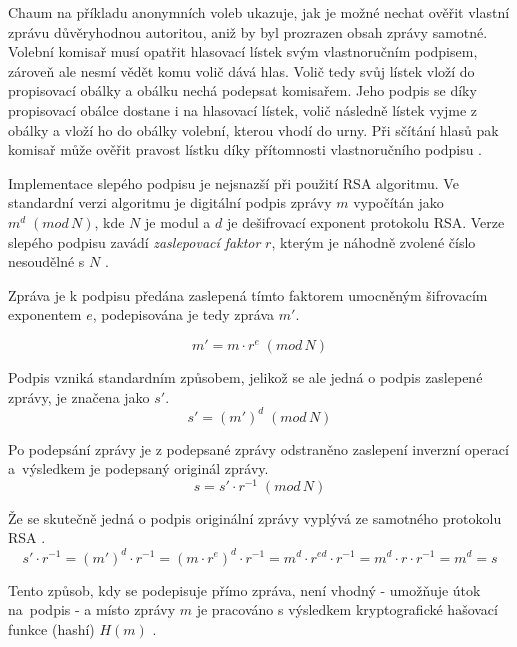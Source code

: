 Chaum na příkladu anonymních voleb ukazuje, jak je možné nechat ověřit vlastní zprávu důvěryhodnou autoritou, aniž by byl prozrazen obsah zprávy samotné.  Volební komisař musí opatřit hlasovací lístek svým vlastnoručním podpisem, zároveň ale nesmí vědět komu volič dává hlas. Volič tedy svůj lístek vloží do propisovací obálky a obálku nechá podepsat komisařem. Jeho podpis se díky propisovací obálce dostane i na hlasovací lístek, volič následně lístek vyjme z obálky a vloží ho do obálky volební, kterou vhodí do urny. Při sčítání hlasů pak komisař může ověřit pravost lístku díky přítomnosti vlastnoručního podpisu \cite{chaum}.

\label{section:blindSign}
Implementace slepého podpisu je nejsnazší při použití RSA algoritmu. Ve standardní verzi algoritmu je digitální podpis zprávy $m$ vypočítán jako $m^d\;(mod\,N)$, kde $N$ je modul a $d$ je dešifrovací exponent protokolu RSA. Verze slepého podpisu zavádí \textit{zaslepovací faktor} $r$, kterým je náhodně zvolené číslo nesoudělné s $N$ \cite{chaum}.

Zpráva je k podpisu předána zaslepená tímto faktorem umocněným šifrovacím exponentem $e$, podepisována je tedy zpráva $m'$.

\[ m' = m \cdot r^e\;(mod\,N) \]

Podpis vzniká standardním způsobem, jelikož se ale jedná o podpis zaslepené zprávy, je značena jako $s'$.
\[ s' = (m')^d \; (mod\,N) \]

Po podepsání zprávy je z podepsané zprávy odstraněno zaslepení inverzní operací a~výsledkem je podepsaný originál zprávy.
\[ s = s' \cdot r^{-1} \;(mod\,N) \]

Že se skutečně jedná o podpis originální zprávy vyplývá ze samotného protokolu RSA \cite{rsa}.
\[ s' \cdot r^{-1} = (m')^d \cdot r^{-1} = (m \cdot r^e)^d \cdot r^{-1} = 
	m^d \cdot r^{ed} \cdot r^{-1} = m^d \cdot r \cdot r^{-1} = m^d = s
\]

Tento způsob, kdy se podepisuje přímo zpráva, není vhodný - umožňuje útok na~podpis - a místo zprávy $m$ je pracováno s výsledkem kryptografické hašovací funkce (hashí) $H(m)$ \cite{RsaAdventures}.